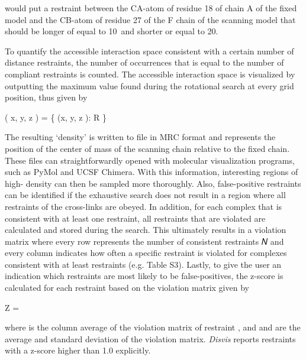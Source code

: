 would put a restraint between the CA-atom of residue 18 of chain A of the fixed
model and the CB-atom of residue 27 of the F chain of the scanning model that
should be longer of equal to 10\Angstrom\ and shorter or equal to 20\Angstrom.


To quantify the accessible interaction space consistent with a certain number
of distance restraints, the number of occurrences that \m{\redais} is equal to
the number of compliant restraints is counted. The accessible interaction space
is visualized by outputting the maximum value found during the rotational
search at every grid position, thus given by

\placeformula[eq:vizualization]
\startformula
\boldV \left( x, y, z \right) = \max \left\{ \redais\left(x, y, z \right): R \in \boldP \right\}
\stopformula

The resulting ‘density’ is written to file in MRC format and represents the
position of the center of mass of the scanning chain relative to the fixed
chain. These files can straightforwardly opened with molecular visualization
programs, such as PyMol and UCSF Chimera. With this information, interesting
regions of high- density can then be sampled more thoroughly. Also,
false-positive restraints can be identified if the exhaustive search does not
result in a region where all restraints of the cross-links are obeyed. In
addition, for each complex that is consistent with at least one restraint, all
restraints that are violated are calculated and stored during the search. This
ultimately results in a violation matrix where every row represents the number
of consistent restraints 𝑁 and every column indicates how often a specific
restraint is violated for complexes consistent with at least  restraints (e.g.
Table S3). Lastly, to give the user an indication which restraints are most
likely to be false-positives, the z-score is calculated for each restraint
based on the violation matrix given by

\placeformula[eq:z-score]
\startformula
Z = 
\stopformula

where  is the column average of the violation matrix of restraint ,
and  and \m{\sigma} are the average and standard deviation of the
violation matrix. {\emph{Disvis}} reports restraints with a z-score higher
than 1.0 explicitly.



